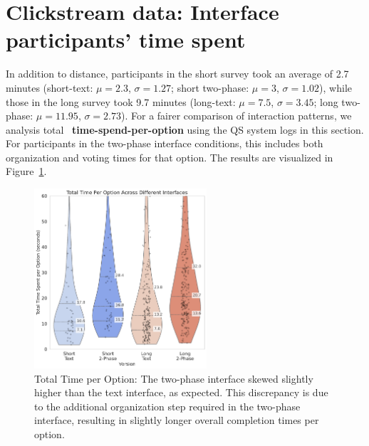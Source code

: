 \section{Clickstream data: Interface participants' time spent}
In addition to distance, participants in the short survey took an average of 2.7 minutes (short-text: $\mu=2.3$, $\sigma=1.27$; short two-phase: $\mu=3$, $\sigma=1.02$), while those in the long survey took 9.7 minutes (long-text: $\mu=7.5$, $\sigma=3.45$; long two-phase: $\mu=11.95$, $\sigma=2.73$). For a fairer comparison of interaction patterns, we analysis total ~\textbf{time-spend-per-option} using the QS system logs in this section. For participants in the two-phase interface conditions, this includes both organization and voting times for that option. The results are visualized in Figure~\ref{fig:total_time}.

\begin{figure}[h]
    \centering
    \includegraphics[width=0.57\textwidth, trim=0 0 0 0, clip]{content/image/time/Total Time Per Option Across Different Interfaces.pdf}
    \captionsetup{width=0.7\textwidth, justification=justified}
    \caption{Total Time per Option: The two-phase interface skewed slightly higher than the text interface, as expected. This discrepancy is due to the additional organization step required in the two-phase interface, resulting in slightly longer overall completion times per option.}
    \label{fig:total_time}
\end{figure}

